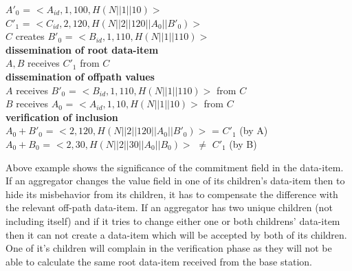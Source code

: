 \begin{exmp}
\begin{itemize}
		$A'_{0}$ = $<A_{id},1,100, H(N||1||10)>$\\
		$C'_{1}$ = $<C_{id},2,120, H(N||2||120||A_{0}||B'_{0})>$\\
		$C$ creates $B'_{0}$ = $<B_{id},1,110, H(N||1||110)>$\\
		\textbf{dissemination of root data-item}\\
			$A,B$ receives $C'_{1}$ from $C$\\
		\textbf{dissemination of offpath values}\\
			$A$ receives $B'_{0}$ = $<B_{id},1,110, H(N||1||110)>$ from $C$\\
			$B$ receives $A_{0}$ = $<A_{id},1,10,H(N||1||10)>$ from $C$\\
		\textbf{verification of inclusion}\\
			$A_{0}+B'_{0}$ = $<2,120,H(N||2||120||A_{0}||B'_{0})>$ = $C'_{1}$ (by A)\\
			$A_{0}+B_{0}$ = $<2,30,H(N||2||30||A_{0}||B_{0})>$ $\neq$ $C'_{1} $ (by B)
	\end{itemize}
	\end{exmp}
Above example shows the significance of the commitment field in the data-item.
If an aggregator changes the value field in one of its children's data-item then to hide its misbehavior from its children, it has to compensate the difference with the relevant off-path data-item. 
If an aggregator has two unique children (not including itself) and if it tries to change either one or both childrens' data-item then it can not create a data-item which will be accepted by both of its children.
One of it's children will complain in the verification phase as they will not be able to calculate the same root data-item received from the base station.

